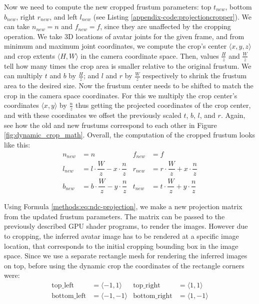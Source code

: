 Now we need to compute the new cropped frustum parameters: top $t_{new}$, bottom $b_{new}$, right $r_{new}$, and left $l_{new}$ (see Listing \ref{appendix-code:projectioncropper}). We can take $n_{new} = n$ and $f_{new} = f$, since they are unaffected by the cropping operation. We take 3D locations of avatar joints for the given frame, and from minimum and maximum joint coordinates, we compute the crop's center $\langle x, y, z\rangle$ and crop extents $\langle H, W \rangle$ in the camera coordinate space. Then, values $\tfrac{H}{z}$ and $\tfrac{W}{z}$ tell how many times the crop area is smaller relative to the original frustum. We can multiply $t$ and $b$ by $\tfrac{H}{z}$; and $l$ and $r$ by $\tfrac{W}{z}$ respectively to shrink the frustum area to the desired size. Now the frustum center needs to be shifted to match the crop in the camera space coordinates. For this we multiply the crop center's coordinates $\langle x, y \rangle$  by $\tfrac{n}{z}$ thus getting the projected coordinates of the crop center, and with these coordinates we offset the previously scaled $t$, $b$, $l$, and $r$. Again, see how the old and new frustums correspond to each other in Figure \ref{fig:dynamic_crop_math}. Overall, the computation of the cropped frustum looks like this:
\begin{align}
	n_{new} &= n & f_{new} &= f \\
	l_{new} &= l\cdot\dfrac{W}{z} - x\cdot \dfrac{n}{z} & r_{new} &= r\cdot\dfrac{W}{z} + x\cdot \dfrac{n}{z} \\
	b_{new} &= b\cdot\dfrac{W}{z} - y\cdot \dfrac{n}{z} & t_{new} &= t\cdot\dfrac{W}{z} + y\cdot \dfrac{n}{z} \label{methods:eq:frustum-new-parameters}
\end{align}

Using Formula \ref{methods:eq:ndc-projection}, we make a new projection matrix from the updated frustum parameters. The matrix can be passed to the previously described GPU shader programs, to render the images. However due to cropping, the inferred avatar image has to be rendered at a specific image location, that corresponds to the initial cropping bounding box in the image space. Since we use a separate rectangle mesh for rendering the inferred images on top, before using the dynamic crop the coordinates of the rectangle corners were:
	\begin{align}
		\text{top{\_}left} &= \langle -1, 1 \rangle & \text{top{\_}right} &= \langle 1, 1 \rangle \\
		\text{bottom{\_}left} &= \langle -1, -1 \rangle & \text{bottom{\_}right} &= \langle 1, -1 \rangle
	\end{align}

